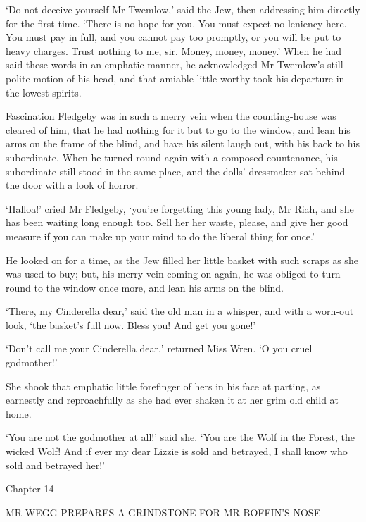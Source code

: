 ‘Do not deceive yourself Mr Twemlow,’ said the Jew, then addressing him
directly for the first time. ‘There is no hope for you. You must expect
no leniency here. You must pay in full, and you cannot pay too promptly,
or you will be put to heavy charges. Trust nothing to me, sir. Money,
money, money.’ When he had said these words in an emphatic manner, he
acknowledged Mr Twemlow’s still polite motion of his head, and that
amiable little worthy took his departure in the lowest spirits.

Fascination Fledgeby was in such a merry vein when the counting-house
was cleared of him, that he had nothing for it but to go to the window,
and lean his arms on the frame of the blind, and have his silent laugh
out, with his back to his subordinate. When he turned round again with a
composed countenance, his subordinate still stood in the same place, and
the dolls’ dressmaker sat behind the door with a look of horror.

‘Halloa!’ cried Mr Fledgeby, ‘you’re forgetting this young lady, Mr
Riah, and she has been waiting long enough too. Sell her her waste,
please, and give her good measure if you can make up your mind to do the
liberal thing for once.’

He looked on for a time, as the Jew filled her little basket with such
scraps as she was used to buy; but, his merry vein coming on again, he
was obliged to turn round to the window once more, and lean his arms on
the blind.

‘There, my Cinderella dear,’ said the old man in a whisper, and with a
worn-out look, ‘the basket’s full now. Bless you! And get you gone!’

‘Don’t call me your Cinderella dear,’ returned Miss Wren. ‘O you cruel
godmother!’

She shook that emphatic little forefinger of hers in his face at
parting, as earnestly and reproachfully as she had ever shaken it at her
grim old child at home.

‘You are not the godmother at all!’ said she. ‘You are the Wolf in
the Forest, the wicked Wolf! And if ever my dear Lizzie is sold and
betrayed, I shall know who sold and betrayed her!’



Chapter 14

MR WEGG PREPARES A GRINDSTONE FOR MR BOFFIN’S NOSE



